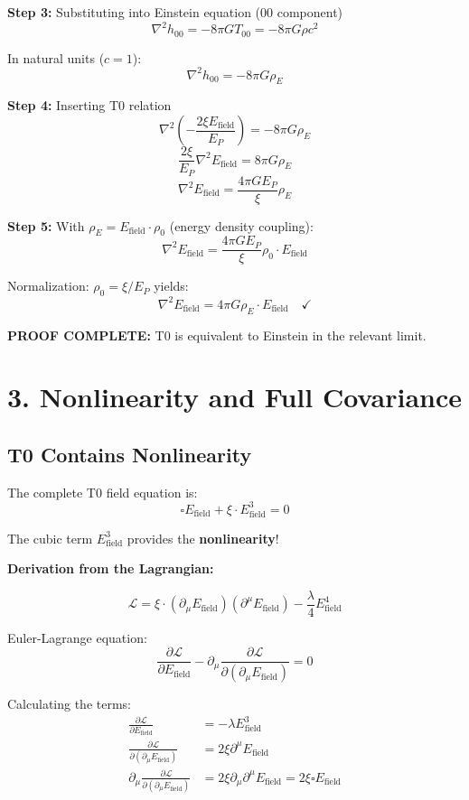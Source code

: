	\textbf{Step 3:} Substituting into Einstein equation (00 component)
	\[
	\nabla^2 h_{00} = -8\pi G T_{00} = -8\pi G \rho c^2
	\]
	
	In natural units ($c=1$):
	\[
	\nabla^2 h_{00} = -8\pi G \rho_E
	\]
	
	\textbf{Step 4:} Inserting T0 relation
	\[
	\nabla^2 \left(-\frac{2\xi E_{\text{field}}}{E_P}\right) = -8\pi G \rho_E
	\]
	\[
	\frac{2\xi}{E_P} \nabla^2 E_{\text{field}} = 8\pi G \rho_E
	\]
	\[
	\nabla^2 E_{\text{field}} = \frac{4\pi G E_P}{\xi} \rho_E
	\]
	
	\textbf{Step 5:} With $\rho_E = E_{\text{field}} \cdot \rho_0$ (energy density coupling):
	\[
	\nabla^2 E_{\text{field}} = \frac{4\pi G E_P}{\xi} \rho_0 \cdot E_{\text{field}}
	\]
	
	Normalization: $\rho_0 = \xi/E_P$ yields:
	\[
	\boxed{\nabla^2 E_{\text{field}} = 4\pi G \rho_E \cdot E_{\text{field}}} \quad \checkmark
	\]
	
	\textbf{PROOF COMPLETE:} T0 is equivalent to Einstein in the relevant limit.
	
	\section*{3. Nonlinearity and Full Covariance}
	
	\subsection*{\textbf{T0 Contains Nonlinearity}}
	
	The complete T0 field equation is:
	\[
	\boxed{\square E_{\text{field}} + \xi \cdot E_{\text{field}}^3 = 0}
	\]
	
	The cubic term $E_{\text{field}}^3$ provides the \textbf{nonlinearity}!
	
	\textbf{Derivation from the Lagrangian:}
	
	\[
	\mathcal{L} = \xi \cdot (\partial_\mu E_{\text{field}})(\partial^\mu E_{\text{field}}) - \frac{\lambda}{4} E_{\text{field}}^4
	\]
	
	Euler-Lagrange equation:
	\[
	\frac{\partial \mathcal{L}}{\partial E_{\text{field}}} - \partial_\mu \frac{\partial \mathcal{L}}{\partial(\partial_\mu E_{\text{field}})} = 0
	\]
	
	Calculating the terms:
	\begin{align*}
		\frac{\partial \mathcal{L}}{\partial E_{\text{field}}} &= -\lambda E_{\text{field}}^3 \\
		\frac{\partial \mathcal{L}}{\partial(\partial_\mu E_{\text{field}})} &= 2\xi \partial^\mu E_{\text{field}} \\
		\partial_\mu \frac{\partial \mathcal{L}}{\partial(\partial_\mu E_{\text{field}})} &= 2\xi \partial_\mu \partial^\mu E_{\text{field}} = 2\xi \square E_{\text{field}}
	\end{align*}
	
